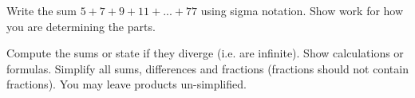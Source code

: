 \documentclass[11pt,addpoints,answers]{exam}
\newcommand{\+}{\, \, + \, \, }
\renewcommand{\-}{\, \, - \, \, }
\renewcommand{\=}{\, \, = \, \, }
\begin{document}
\begin{questions}
\newpage

\question[15] Write the sum  $5 + 7 + 9 + 11 + ... + 77$  using sigma notation. Show work for how you are determining the parts.

\vspace*{0.35in}
\begin{flushright}\end{flushright}

\question Compute the sums or state if they diverge (i.e. are infinite).  Show calculations or formulas. Simplify all sums, differences and fractions (fractions should not contain fractions).  You may leave products un-simplified.

\begin{parts}


\end{parts}
\end{questions}
\end{document}
